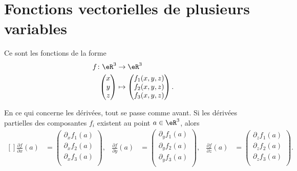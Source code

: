 \section{Fonctions vectorielles de plusieurs variables}

Ce sont les fonctions de la forme
\begin{equation}
    \begin{aligned}
        f\colon \eR^3&\to \eR^3 \\
        \begin{pmatrix}
            x    \\ 
            y    \\ 
            z    
        \end{pmatrix}&\mapsto \begin{pmatrix}
            f_1(x,y,z)\\
            f_2(x,y,z)\\
            f_3(x,y,z)
        \end{pmatrix}.
    \end{aligned}
\end{equation}

En ce qui concerne les dérivées, tout se passe comme avant. Si les dérivées partielles des composantes $f_i$ existent au point $a\in\eR^3$, alors
\begin{equation}
    \begin{aligned}[]
        \frac{ \partial f }{ \partial x }(a)&=\begin{pmatrix}
            \partial_xf_1(a)    \\ 
            \partial_xf_2(a)    \\ 
            \partial_xf_3(a)    \\ 
        \end{pmatrix},&
        \frac{ \partial f }{ \partial y }(a)&=\begin{pmatrix}
            \partial_yf_1(a)    \\ 
            \partial_yf_2(a)    \\ 
            \partial_yf_3(a)    \\ 
        \end{pmatrix},&
        \frac{ \partial f }{ \partial z }(a)&=\begin{pmatrix}
            \partial_zf_1(a)    \\ 
            \partial_zf_2(a)    \\ 
            \partial_zf_3(a)    \\ 
        \end{pmatrix}.
    \end{aligned}
\end{equation}

